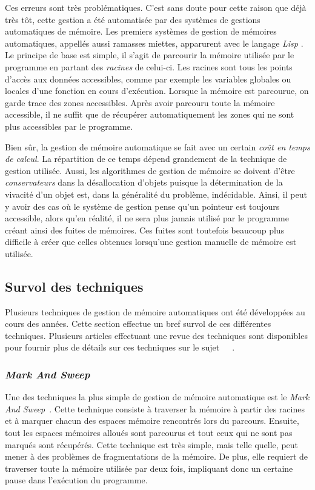 \documentclass[12pt,oneside,letterpaper,francais]{book}
\newcommand{\lisp}{{\textit{Lisp }}}
\begin{document}
Ces erreurs sont très problématiques. C'est sans doute pour cette
raison que déjà très tôt, cette gestion a été automatisée par des
systèmes de gestions automatiques de mémoire. Les premiers systèmes de
gestion de mémoires automatiques, appellés aussi ramasses miettes,
apparurent avec le langage \lisp. Le principe de base est simple, il
s'agit de parcourir la mémoire utilisée par le programme en partant
des \emph{racines} de celui-ci. Les racines sont tous les points
d'accès aux données accessibles, comme par exemple les variables
globales ou locales d'une fonction en cours d'exécution. Lorsque la
mémoire est parcourue, on garde trace des zones accessibles. Après
avoir parcouru toute la mémoire accessible, il ne suffit que de
récupérer automatiquement les zones qui ne sont plus accessibles par
le programme.

Bien sûr, la gestion de mémoire automatique se fait avec un certain
\emph{coût en temps de calcul}. La répartition de ce temps dépend
grandement de la technique de gestion utilisée. Aussi, les algorithmes
de gestion de mémoire se doivent d'être \emph{conservateurs} dans la
désallocation d'objets puisque la détermination de la vivacité d'un
objet est, dans la généralité du problème, indécidable. Ainsi, il peut
y avoir des cas où le système de gestion pense qu'un pointeur est
toujours accessible, alors qu'en réalité, il ne sera plus jamais
utilisé par le programme créant ainsi des fuites de mémoires. Ces
fuites sont toutefois beaucoup plus difficile à créer que celles
obtenues lorsqu'une gestion manuelle de mémoire est utilisée.


\subsection{Survol des techniques}
Plusieurs techniques de gestion de mémoire automatiques ont été
développées au cours des années. Cette section effectue un bref survol
de ces différentes techniques. Plusieurs articles effectuant une revue
des techniques sont disponibles pour fournir plus de détails sur ces
techniques sur le
sujet~\cite{GC_REVIEW1}~\cite{GC_REVIEW2}~\cite{GC_REVIEW3}. 

\subsubsection{\textit{Mark And Sweep}}
Une des techniques la plus simple de gestion de mémoire automatique
est le \textit{Mark And Sweep}~\cite{LISP_ORIGINS}. Cette technique
consiste à traverser la mémoire à partir des racines et à marquer
chacun des espaces mémoire rencontrés lors du parcours. Ensuite, tout
les espaces mémoires alloués sont parcourus et tout ceux qui ne sont
pas marqués sont récupérés. Cette technique est très simple, mais
telle quelle, peut mener à des problèmes de fragmentations de la
mémoire. De plus, elle requiert de traverser toute la mémoire utilisée
par deux fois, impliquant donc un certaine pause dans l'exécution du
programme.
\end{document}
